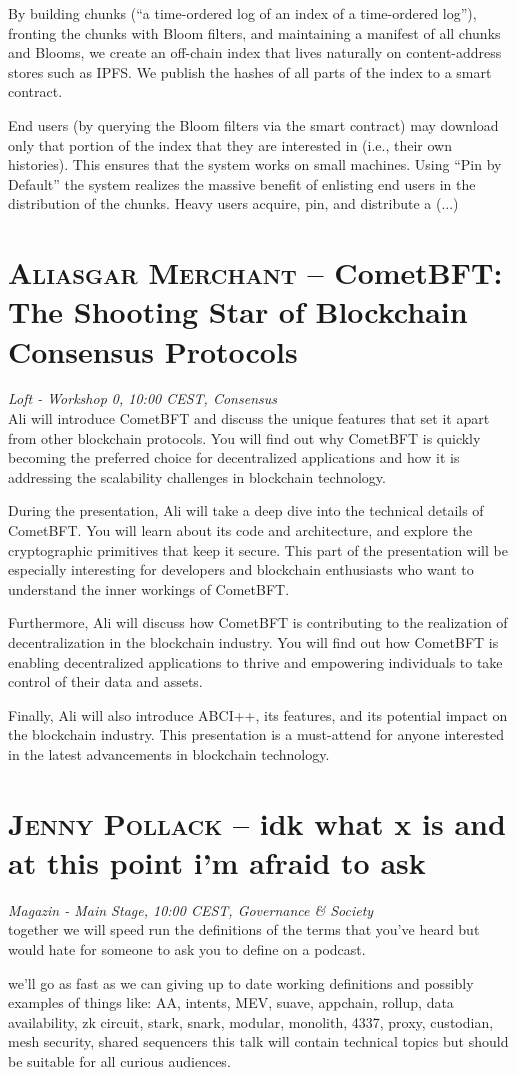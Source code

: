 By building chunks (``a time-ordered log of an index of a time-ordered log''), fronting the chunks with Bloom filters, and maintaining a manifest of all chunks and Blooms, we create an off-chain index that lives naturally on content-address stores such as IPFS. We publish the hashes of all parts of the index to a smart contract.

End users (by querying the Bloom filters via the smart contract) may download only that portion of the index that they are interested in (i.e., their own histories). This ensures that the system works on small machines. Using ``Pin by Default'' the system realizes the massive benefit of enlisting end users in the distribution of the chunks. Heavy users acquire, pin, and distribute a
(...)\clearpage
\section {\textsc{Aliasgar Merchant} -- CometBFT: The Shooting Star of Blockchain Consensus Protocols
} \noindent \textit {Loft - Workshop 0, 10:00 CEST, Consensus
}\\[1em] Ali will introduce CometBFT and discuss the unique features that set it apart from other blockchain protocols. You will find out why CometBFT is quickly becoming the preferred choice for decentralized applications and how it is addressing the scalability challenges in blockchain technology.

During the presentation, Ali will take a deep dive into the technical details of CometBFT. You will learn about its code and architecture, and explore the cryptographic primitives that keep it secure. This part of the presentation will be especially interesting for developers and blockchain enthusiasts who want to understand the inner workings of CometBFT.

Furthermore, Ali will discuss how CometBFT is contributing to the realization of decentralization in the blockchain industry. You will find out how CometBFT is enabling decentralized applications to thrive and empowering individuals to take control of their data and assets.

Finally, Ali will also introduce ABCI++, its features, and its potential impact on the blockchain industry. This presentation is a must-attend for anyone interested in the latest advancements in blockchain technology.
\par \clearpage
\section {\textsc{Jenny Pollack} -- idk what x is and at this point i'm afraid to ask
} \noindent \textit {Magazin - Main Stage, 10:00 CEST, Governance \&
 Society
}\\[1em] together we will speed run the definitions of the terms that you've heard but would hate for someone to ask you to define on a podcast.
\par we'll go as fast as we can giving up to date working definitions and possibly examples of things like: AA, intents, MEV, suave, appchain, rollup, data availability, zk circuit, stark, snark, modular, monolith, 4337, proxy, custodian, mesh security, shared sequencers
this talk will contain technical topics but should be suitable for all curious audiences.
\clearpage
